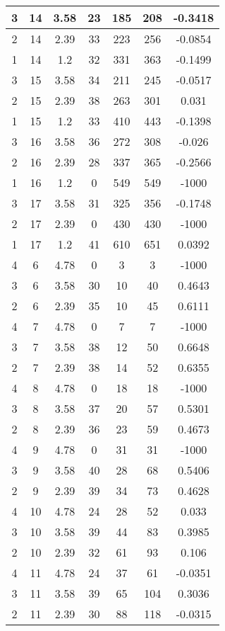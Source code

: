\documentclass[letterpaper, 12pt]{article}
\begin{document}
\begin{longtable}{|c|c|c|c|c|c|c|}
\hline
3 & 14 & 3.58 & 23 & 185 & 208 & -0.3418 \\
\hline
2 & 14 & 2.39 & 33 & 223 & 256 & -0.0854 \\
\hline
1 & 14 & 1.2 & 32 & 331 & 363 & -0.1499 \\
\hline
3 & 15 & 3.58 & 34 & 211 & 245 & -0.0517 \\
\hline
2 & 15 & 2.39 & 38 & 263 & 301 & 0.031 \\
\hline
1 & 15 & 1.2 & 33 & 410 & 443 & -0.1398 \\
\hline
3 & 16 & 3.58 & 36 & 272 & 308 & -0.026 \\
\hline
2 & 16 & 2.39 & 28 & 337 & 365 & -0.2566 \\
\hline
1 & 16 & 1.2 & 0 & 549 & 549 & -1000 \\
\hline
3 & 17 & 3.58 & 31 & 325 & 356 & -0.1748 \\
\hline
2 & 17 & 2.39 & 0 & 430 & 430 & -1000 \\
\hline
1 & 17 & 1.2 & 41 & 610 & 651 & 0.0392 \\
\hline
4 & 6 & 4.78 & 0 & 3 & 3 & -1000 \\
\hline
3 & 6 & 3.58 & 30 & 10 & 40 & 0.4643 \\
\hline
2 & 6 & 2.39 & 35 & 10 & 45 & 0.6111 \\
\hline
4 & 7 & 4.78 & 0 & 7 & 7 & -1000 \\
\hline
3 & 7 & 3.58 & 38 & 12 & 50 & 0.6648 \\
\hline
2 & 7 & 2.39 & 38 & 14 & 52 & 0.6355 \\
\hline
4 & 8 & 4.78 & 0 & 18 & 18 & -1000 \\
\hline
3 & 8 & 3.58 & 37 & 20 & 57 & 0.5301 \\
\hline
2 & 8 & 2.39 & 36 & 23 & 59 & 0.4673 \\
\hline
4 & 9 & 4.78 & 0 & 31 & 31 & -1000 \\
\hline
3 & 9 & 3.58 & 40 & 28 & 68 & 0.5406 \\
\hline
2 & 9 & 2.39 & 39 & 34 & 73 & 0.4628 \\
\hline
4 & 10 & 4.78 & 24 & 28 & 52 & 0.033 \\
\hline
3 & 10 & 3.58 & 39 & 44 & 83 & 0.3985 \\
\hline
2 & 10 & 2.39 & 32 & 61 & 93 & 0.106 \\
\hline
4 & 11 & 4.78 & 24 & 37 & 61 & -0.0351 \\
\hline
3 & 11 & 3.58 & 39 & 65 & 104 & 0.3036 \\
\hline
2 & 11 & 2.39 & 30 & 88 & 118 & -0.0315 \\

\end{longtable}
\end{document}
